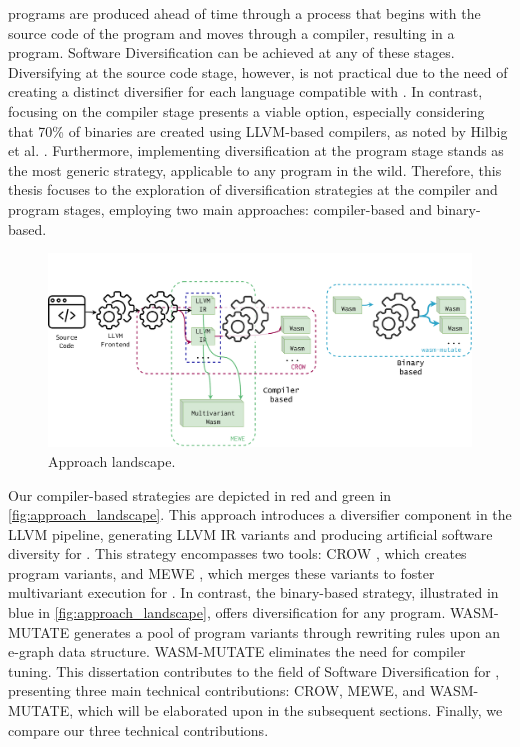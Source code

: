 


\Wasm programs are produced ahead of time through a process that begins with the source code of the program and moves through a compiler, resulting in a \Wasm program. 
Software Diversification can be achieved at any of these stages. 
Diversifying at the source code stage, however, is not practical due to the need of creating a distinct diversifier for each language compatible with \Wasm. 
In contrast, focusing on the compiler stage presents a viable option, especially considering that 70\% of \Wasm binaries are created using LLVM-based compilers, as noted by Hilbig et al. \cite{Hilbig2021AnES}. 
Furthermore, implementing diversification at the \Wasm program stage stands as the most generic strategy, applicable to any \Wasm program in the wild. 
Therefore, this thesis focuses to the exploration of diversification strategies at the compiler and \Wasm program stages, employing two main approaches: compiler-based and binary-based.


\begin{figure}[h]
	\centering
	\includegraphics[width=1.0\textwidth]{figures/landscape.pdf}
	\caption{Approach landscape.}
	\label{fig:approach_landscape}
\end{figure}

Our compiler-based strategies are depicted in red and green in \autoref{fig:approach_landscape}. 
This approach introduces a diversifier component in the LLVM pipeline, generating LLVM IR variants and producing artificial software diversity for \wasm. 
This strategy encompasses two tools: CROW \cite{CROW}, which creates \wasm program variants, and MEWE \cite{MEWE}, which merges these variants to foster multivariant execution for \wasm.
In contrast, the binary-based strategy, illustrated in blue in \autoref{fig:approach_landscape}, offers diversification for any \Wasm program. 
WASM-MUTATE \cite{WASM-MUTATE} generates a pool of \Wasm program variants through rewriting rules upon an e-graph \cite{e-graph} data structure.
WASM-MUTATE eliminates the need for compiler tuning.
This dissertation contributes to the field of Software Diversification for \Wasm, presenting three main technical contributions: CROW, MEWE, and WASM-MUTATE, which will be elaborated upon in the subsequent sections.
Finally, we compare our three technical contributions.

